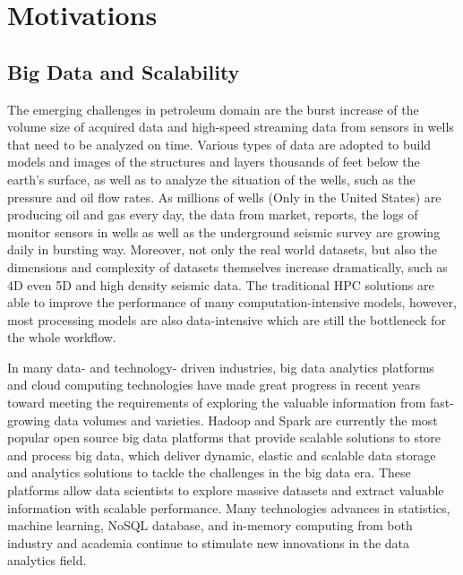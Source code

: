 

\section{Motivations}

\subsection{Big Data and Scalability}

The emerging challenges in petroleum domain are the burst increase of the volume size of acquired data and high-speed streaming data from sensors in wells that need to be analyzed on time. Various types of data are adopted to build models and images of the structures and layers thousands of feet below the earth's surface, as well as to analyze the situation of the wells, such as the pressure and oil flow rates. As millions of wells (Only in the United States) are producing oil and gas every day, the data from market, reports, the logs of monitor sensors in wells as well as the underground seismic survey are growing daily in bursting way\cite{bigdataofindustry}. Moreover, not only the real world datasets, but also the dimensions and complexity of datasets themselves increase dramatically, such as 4D even 5D and high density seismic data. The traditional HPC solutions are able to improve the performance of many computation-intensive models, however,  most processing models are also data-intensive which are still the bottleneck for the whole workflow. 

In many data- and technology- driven industries, big data analytics platforms and cloud computing technologies have made great progress in recent years toward meeting the requirements of exploring the valuable information from fast-growing data volumes and varieties.  Hadoop and Spark are currently the most popular open source big data platforms that provide scalable solutions to store and process big data, which deliver dynamic, elastic and scalable data storage and analytics solutions to tackle the challenges in the big data era. These platforms allow data scientists to explore massive datasets and extract valuable information with scalable performance. Many technologies advances in statistics, machine learning, NoSQL database, and in-memory computing from both industry and academia continue to stimulate new innovations in the data analytics field.

